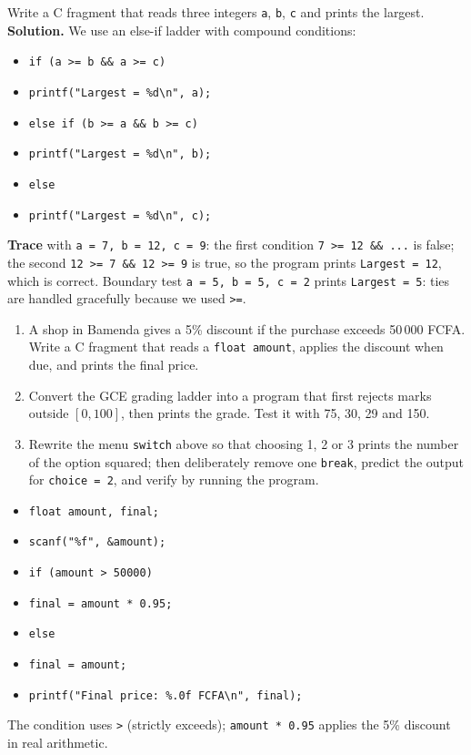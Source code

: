 \documentclass[11pt]{article}
\begin{document}
\begin{exoresolu}
Write a C fragment that reads three integers \texttt{a}, \texttt{b}, \texttt{c} and prints the largest.
\tcblower
\textbf{Solution.} We use an else-if ladder with compound conditions:

\begin{itemize}
\item \texttt{if (a >= b \&\& a >= c)}
\item \texttt{\quad printf("Largest = \%d\textbackslash n", a);}
\item \texttt{else if (b >= a \&\& b >= c)}
\item \texttt{\quad printf("Largest = \%d\textbackslash n", b);}
\item \texttt{else}
\item \texttt{\quad printf("Largest = \%d\textbackslash n", c);}
\end{itemize}

\textbf{Trace} with \texttt{a = 7, b = 12, c = 9}: the first condition \texttt{7 >= 12 \&\& ...} is false; the second \texttt{12 >= 7 \&\& 12 >= 9} is true, so the program prints \texttt{Largest = 12}, which is correct. Boundary test \texttt{a = 5, b = 5, c = 2} prints \texttt{Largest = 5}: ties are handled gracefully because we used \texttt{>=}.
\end{exoresolu}

\begin{exercice}[Practice]
\begin{enumerate}
\item A shop in Bamenda gives a 5\% discount if the purchase exceeds 50\,000 FCFA. Write a C fragment that reads a \texttt{float amount}, applies the discount when due, and prints the final price.
\item Convert the GCE grading ladder into a program that first rejects marks outside $[0, 100]$, then prints the grade. Test it with 75, 30, 29 and 150.
\item Rewrite the menu \texttt{switch} above so that choosing 1, 2 or 3 prints the number of the option squared; then deliberately remove one \texttt{break}, predict the output for \texttt{choice = 2}, and verify by running the program.
\end{enumerate}
\end{exercice}

\begin{corrige}[Exercise 1]
\begin{itemize}
\item \texttt{float amount, final;}
\item \texttt{scanf("\%f", \&amount);}
\item \texttt{if (amount > 50000)}
\item \texttt{\quad final = amount * 0.95;}
\item \texttt{else}
\item \texttt{\quad final = amount;}
\item \texttt{printf("Final price: \%.0f FCFA\textbackslash n", final);}
\end{itemize}
The condition uses \texttt{>} (strictly exceeds); \texttt{amount * 0.95} applies the 5\% discount in real arithmetic.
\end{corrige}
\end{document}
